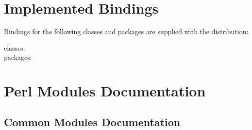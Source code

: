 \documentclass{book}
\begin{document}
\chapter[Bindings]{Implemented Bindings}\label{included.bindings}
Bindings for the following classes and packages are supplied with the distribution:
\begin{description}
\item[classes:] \CurrentClasses
\item[packages:] \CurrentPackages
\end{description}

\chapter[Modules]{Perl  Modules Documentation}\label{modules}





\section[Common Modules]{Common Modules Documentation}\label{modules.common}



















\end{document}

